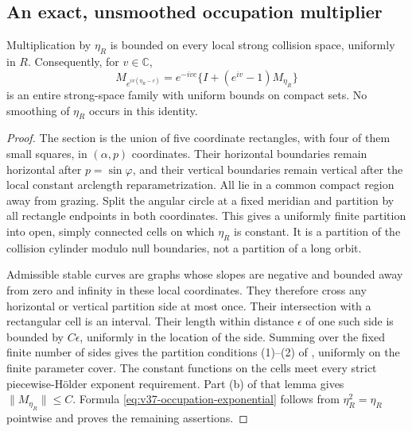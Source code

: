 \subsection{An exact, unsmoothed occupation multiplier}
\begin{lemma}
\label{lem:v37-section-multiplier}
Multiplication by $\eta_R$ is bounded on every local strong collision
space, uniformly in $R$. Consequently, for $v\in\mathbb C$,
\begin{equation}\label{eq:v37-occupation-exponential}
 M_{e^{iv(\eta_R-c)}}=e^{-ivc}\{I+(e^{iv}-1)M_{\eta_R}\}
\end{equation}
is an entire strong-space family with uniform bounds on compact sets.
No smoothing of $\eta_R$ occurs in this identity.
\end{lemma}
\begin{proof}
The section is the union of five coordinate rectangles, with four of
them small squares, in $(\alpha,p)$ coordinates. Their horizontal
boundaries remain horizontal after $p=\sin\varphi$, and their vertical
boundaries remain vertical after the local constant arclength
reparametrization. All lie in a common compact region away from grazing.
Split the angular circle at a fixed meridian and partition by all
rectangle endpoints in both coordinates. This gives a uniformly finite
partition into open, simply connected cells on which $\eta_R$ is
constant. It is a partition of the collision cylinder modulo null
boundaries, not a partition of a long orbit.

Admissible stable curves are graphs whose slopes are negative and
bounded away from zero and infinity in these local coordinates.
They therefore cross any horizontal or vertical partition side at
most once. Their intersection with a rectangular cell is an interval.
Their length within distance $\epsilon$ of one such side is bounded
by $C\epsilon$, uniformly in the location of the side. Summing over
the fixed finite number of sides gives the partition conditions
(1)--(2) of \cite[Lemma 3.3]{DPZ}, uniformly on the finite parameter
cover. The constant functions on the cells meet every strict
piecewise-H\"older exponent requirement. Part (b) of that lemma gives
$\|M_{\eta_R}\|\le C$. Formula
\eqref{eq:v37-occupation-exponential} follows from $\eta_R^2=\eta_R$
pointwise and proves the remaining assertions.
\end{proof}

